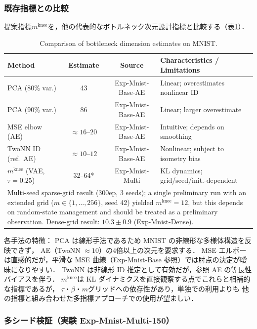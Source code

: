 \documentclass[11pt,a4paper]{jsarticle}
\newcommand{\mknee}{m^{\mathrm{knee}}}
\begin{document}
\subsubsection{既存指標との比較}\label{sec:exp_comparison}

提案指標$\mknee$を，他の代表的なボトルネック次元設計指標と比較する（表\ref{tab:method_comparison}）．

\begin{table}[H]
\centering
\caption{Comparison of bottleneck dimension estimates on MNIST.}
\label{tab:method_comparison}
\small
\begin{tabular}{p{3.8cm}cc p{4.8cm}}
\toprule
Method & Estimate & Source & Characteristics / Limitations \\
\midrule
PCA (80\% var.) & 43 & Exp-Mnist-Base-AE & Linear; overestimates nonlinear ID \\
PCA (90\% var.) & 86 & Exp-Mnist-Base-AE & Linear; larger overestimate \\
MSE elbow (AE) & $\approx16$--$20$ & Exp-Mnist-Base-AE & Intuitive; depends on smoothing \\
TwoNN ID (ref.\ AE) & $\approx10$--$12$ & Exp-Mnist-Base-AE & Nonlinear; subject to isometry bias \\
$\mknee$ (VAE, $\tau{=}0.25$) & 32--64* & Exp-Mnist-Multi & KL dynamics; grid/seed/init.-dependent \\
\midrule
\multicolumn{4}{p{13cm}}{\footnotesize *Multi-seed sparse-grid result (300ep, 3 seeds); a single preliminary run with an extended grid ($m\in\{1,\ldots,256\}$, seed 42) yielded $\mknee=12$, but this depends on random-state management and should be treated as a preliminary observation. Dense-grid result: $10.3\pm0.9$ (Exp-Mnist-Dense).} \\
\bottomrule
\end{tabular}
\end{table}

各手法の特徴：
PCA は線形手法であるため MNIST の非線形な多様体構造を反映できず，
AE（TwoNN $\approx 10$）の4倍以上の次元を要求する．
MSE エルボーは直感的だが，平滑な MSE 曲線（Exp-Mnist-Base 参照）では肘点の決定が曖昧になりやすい．
TwoNN は非線形 ID 推定として有効だが，参照 AE の等長性バイアスを伴う．
$\mknee$は KL ダイナミクスを直接観察する点でこれらと相補的な指標であるが，
$\tau$・$\beta$・$m$グリッドへの依存性があり，単独での利用よりも
他の指標と組み合わせた多指標アプローチでの使用が望ましい．

\subsubsection{多シード検証（実験 Exp-Mnist-Multi-150）}\label{sec:exp_multiseed}
\end{document}
